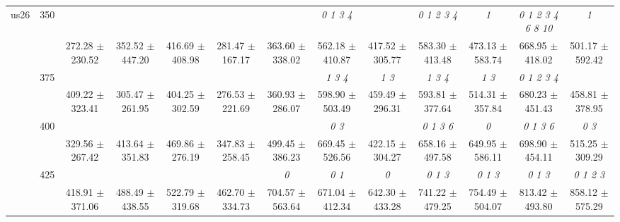 \begin{table}[h]
{\begin{tabular}{
        ccccccccccccc}
 \multirow{4}{*}{us26} & \multirow{2}{*}{350}& & & & & & \textit{ 0 1 3 4 }& & \textit{ 0 1 2 3 4 }& \textit{ 1 }& \textit{  0  1  2  3  4  6  8 10 }& \textit{ 1 } \\ 
 & & 272.28 $\pm$ 230.52& 352.52 $\pm$ 447.20& 416.69 $\pm$ 408.98& 281.47 $\pm$ 167.17& 363.60 $\pm$ 338.02& 562.18 $\pm$ 410.87& 417.52 $\pm$ 305.77& 583.30 $\pm$ 413.48& 473.13 $\pm$ 583.74& 668.95 $\pm$ 418.02& 501.17 $\pm$ 592.42 \\ 
 & \multirow{2}{*}{375}& \cellcolor[HTML]{EFEFEF} & \cellcolor[HTML]{EFEFEF} & \cellcolor[HTML]{EFEFEF} & \cellcolor[HTML]{EFEFEF} & \cellcolor[HTML]{EFEFEF} & \cellcolor[HTML]{EFEFEF} \textit{ 1 3 4 }& \cellcolor[HTML]{EFEFEF} \textit{ 1 3 }& \cellcolor[HTML]{EFEFEF} \textit{ 1 3 4 }& \cellcolor[HTML]{EFEFEF} \textit{ 1 3 }& \cellcolor[HTML]{EFEFEF} \textit{ 0 1 2 3 4 }& \cellcolor[HTML]{EFEFEF}  \\ 
 & & \cellcolor[HTML]{EFEFEF} 409.22 $\pm$ 323.41& \cellcolor[HTML]{EFEFEF} 305.47 $\pm$ 261.95& \cellcolor[HTML]{EFEFEF} 404.25 $\pm$ 302.59& \cellcolor[HTML]{EFEFEF} 276.53 $\pm$ 221.69& \cellcolor[HTML]{EFEFEF} 360.93 $\pm$ 286.07& \cellcolor[HTML]{EFEFEF} 598.90 $\pm$ 503.49& \cellcolor[HTML]{EFEFEF} 459.49 $\pm$ 296.31& \cellcolor[HTML]{EFEFEF} 593.81 $\pm$ 377.64& \cellcolor[HTML]{EFEFEF} 514.31 $\pm$ 357.84& \cellcolor[HTML]{EFEFEF} 680.23 $\pm$ 451.43& \cellcolor[HTML]{EFEFEF} 458.81 $\pm$ 378.95 \\ 
 & \multirow{2}{*}{400}& & & & & & \textit{ 0 3 }& & \textit{ 0 1 3 6 }& \textit{ 0 }& \textit{ 0 1 3 6 }& \textit{ 0 3 } \\ 
 & & 329.56 $\pm$ 267.42& 413.64 $\pm$ 351.83& 469.86 $\pm$ 276.19& 347.83 $\pm$ 258.45& 499.45 $\pm$ 386.23& 669.45 $\pm$ 526.56& 422.15 $\pm$ 304.27& 658.16 $\pm$ 497.58& 649.95 $\pm$ 586.11& 698.90 $\pm$ 454.11& 515.25 $\pm$ 309.29 \\ 
 & \multirow{2}{*}{425}& \cellcolor[HTML]{EFEFEF} & \cellcolor[HTML]{EFEFEF} & \cellcolor[HTML]{EFEFEF} & \cellcolor[HTML]{EFEFEF} & \cellcolor[HTML]{EFEFEF} \textit{ 0 }& \cellcolor[HTML]{EFEFEF} \textit{ 0 1 }& \cellcolor[HTML]{EFEFEF} \textit{ 0 }& \cellcolor[HTML]{EFEFEF} \textit{ 0 1 3 }& \cellcolor[HTML]{EFEFEF} \textit{ 0 1 3 }& \cellcolor[HTML]{EFEFEF} \textit{ 0 1 3 }& \cellcolor[HTML]{EFEFEF} \textit{ 0 1 2 3 } \\ 
 & & \cellcolor[HTML]{EFEFEF} 418.91 $\pm$ 371.06& \cellcolor[HTML]{EFEFEF} 488.49 $\pm$ 438.55& \cellcolor[HTML]{EFEFEF} 522.79 $\pm$ 319.68& \cellcolor[HTML]{EFEFEF} 462.70 $\pm$ 334.73& \cellcolor[HTML]{EFEFEF} 704.57 $\pm$ 563.64& \cellcolor[HTML]{EFEFEF} 671.04 $\pm$ 412.34& \cellcolor[HTML]{EFEFEF} 642.30 $\pm$ 433.28& \cellcolor[HTML]{EFEFEF} 741.22 $\pm$ 479.25& \cellcolor[HTML]{EFEFEF} 754.49 $\pm$ 504.07& \cellcolor[HTML]{EFEFEF} 813.42 $\pm$ 493.80& \cellcolor[HTML]{EFEFEF} 858.12 $\pm$ 575.29 \\ 

\end{tabular}}
\end{table}
